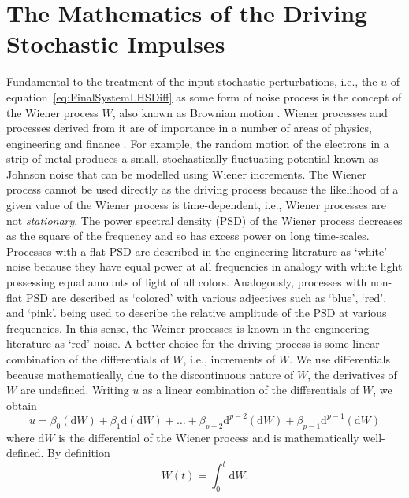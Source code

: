 \documentclass[a4paper,fleqn,usenatbib]{mnras}
\begin{document}
\section[Stochastic Impulses Mathematics]{The Mathematics of the Driving Stochastic Impulses}\label{sec:RHS}

Fundamental to the treatment of the input stochastic perturbations, i.e., the $u$ of equation~\eqref{eq:FinalSystemLHSDiff} as some form of noise process is the concept of the Wiener process $W$, also known as Brownian motion \citep{Doob,Davis,Jacobs,Oksendal}. Wiener processes and processes derived from it are of importance in a number of areas of physics, engineering and finance \citep{Jacobs}. For example, the random motion of the electrons in a strip of metal produces a small, stochastically fluctuating potential known as Johnson noise \citep{Gillespie96} that can be modelled using Wiener increments. The Wiener process cannot be used directly as the driving process because the likelihood of a given value of the Wiener process is time-dependent, i.e., Wiener processes are not \textit{stationary}. The power spectral density (PSD) of the Wiener process decreases as the square of the frequency and so has excess power on long time-scales. Processes with a flat PSD are described in the engineering literature as `white' noise because they have equal power at all frequencies in analogy with white light possessing equal amounts of light of all colors. Analogously, processes with non-flat PSD are described as `colored' with various adjectives such as `blue', `red', and `pink'. being used to describe the relative amplitude of the PSD at various frequencies. In this sense, the Weiner processes is known in the engineering literature as `red'-noise. A better choice for the driving process is some linear combination of the differentials of $W$, i.e., increments of $W$. We use differentials because mathematically, due to the discontinuous nature of $W$, the derivatives of $W$ are undefined. Writing $u$ as a linear combination of the differentials of $W$, we obtain
\begin{equation}\label{eq:FinalSystemRHSDiff}
u = \beta_{0} (\mathrm{d}W) + \beta_{1} \mathrm{d}(\mathrm{d}W) + \ldots + \beta_{p-2} \mathrm{d}^{p-2}(\mathrm{d}W) + \beta_{p-1} \mathrm{d}^{p-1}(\mathrm{d}W)
\end{equation}
where $\mathrm{d}W$ is the differential of the Wiener process and is mathematically well-defined. By definition
\begin{equation}\label{eq:WienerIncr}
W(t) = \int_{0}^{t} \mathrm{d}W.
\end{equation}
\end{document}
